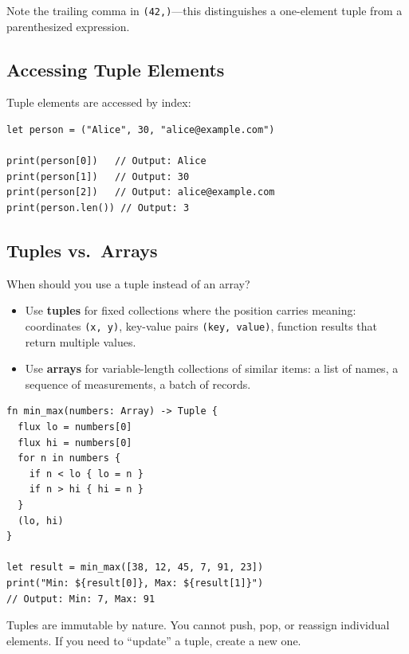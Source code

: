 Note the trailing comma in \lstinline|(42,)|---this distinguishes a one-element tuple from a parenthesized expression.

\subsection{Accessing Tuple Elements}\label{sec:tuple-access}

Tuple elements are accessed by index:

\begin{lstlisting}[language=Lattice, caption={Accessing tuple elements}]
let person = ("Alice", 30, "alice@example.com")

print(person[0])   // Output: Alice
print(person[1])   // Output: 30
print(person[2])   // Output: alice@example.com
print(person.len()) // Output: 3
\end{lstlisting}

\subsection{Tuples vs.\ Arrays}\label{sec:tuples-vs-arrays}

When should you use a tuple instead of an array?

\begin{itemize}
  \item Use \textbf{tuples} for fixed collections where the position carries meaning: coordinates \lstinline|(x, y)|, key-value pairs \lstinline|(key, value)|, function results that return multiple values.
  \item Use \textbf{arrays} for variable-length collections of similar items: a list of names, a sequence of measurements, a batch of records.
\end{itemize}

\begin{lstlisting}[language=Lattice, caption={Tuples for multiple return values}]
fn min_max(numbers: Array) -> Tuple {
  flux lo = numbers[0]
  flux hi = numbers[0]
  for n in numbers {
    if n < lo { lo = n }
    if n > hi { hi = n }
  }
  (lo, hi)
}

let result = min_max([38, 12, 45, 7, 91, 23])
print("Min: ${result[0]}, Max: ${result[1]}")
// Output: Min: 7, Max: 91
\end{lstlisting}

Tuples are immutable by nature. You cannot push, pop, or reassign individual elements. If you need to ``update'' a tuple, create a new one.

